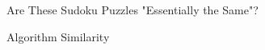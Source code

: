 \documentclass[final]{beamer}
\newlength{\colwidth}
\begin{document}
\begin{frame}[t]
\begin{columns}[t]
\begin{column}{\colwidth}
\begin{block}{\Large Are These Sudoku Puzzles "Essentially the Same"?}
    \begin{figure}
       \centering
       \quad \quad \quad 
   \end{figure}
  \end{block}

\begin{alertblock}{\Large Algorithm Similarity}


\end{alertblock}
\end{column}
\end{columns}
\end{frame}
\end{document}
